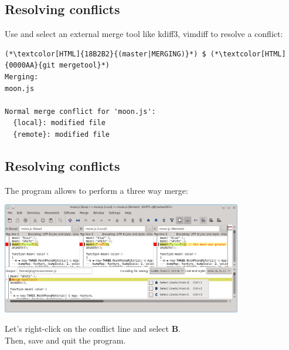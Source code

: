 \subsection{Resolving conflicts}
\begin{frame}[fragile]
  \subslidetitle
  Use  and select an external merge tool like kdiff3, vimdiff to resolve a conflict:

  \begin{lstlisting}
(*\textcolor[HTML]{18B2B2}{(master|MERGING)}*) $ (*\textcolor[HTML]{0000AA}{git mergetool}*)
Merging:
moon.js

Normal merge conflict for 'moon.js':
  {local}: modified file
  {remote}: modified file
\end{lstlisting}

\end{frame}

\subsection{Resolving conflicts}
\begin{frame}[fragile]
  \subslidetitle
  The program  allows to perform a three way merge:
  \\
  \vspace{1em}
  \centerline{\includegraphics[width=10.5cm]{../screen/kdiff3.png}}

  \vspace{1em}
  Let's right-click on the conflict line and select \textbf{B}.
  \\Then, save and quit the program.
\end{frame}

